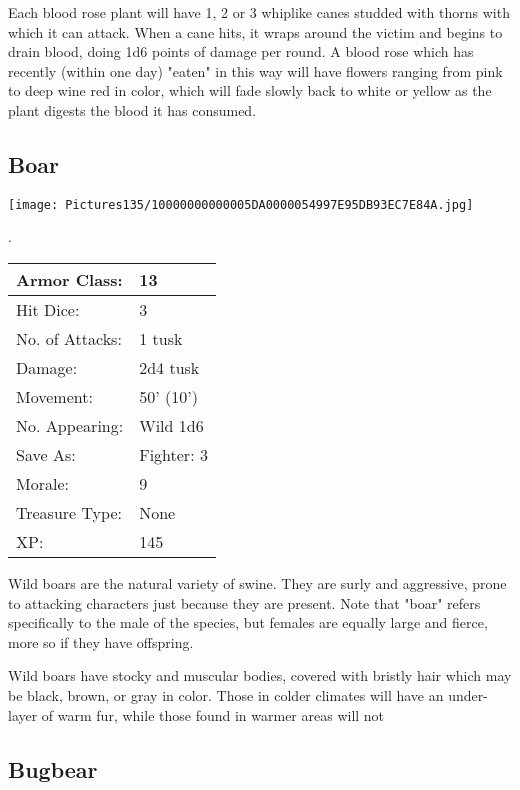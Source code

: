 \documentclass[a4paper,twoside,openany,10pt]{book}
\begin{document}
\begin{multicols}{2}
Each blood rose plant will have 1, 2 or 3 whiplike canes studded with thorns with which it can attack. When a cane hits, it wraps around the victim and begins to drain blood, doing 1d6 points of damage per round. A blood rose which has recently (within one day) "eaten" in this way will have flowers ranging from pink to deep wine red in color, which will fade slowly back to white or yellow as the plant digests the blood it has consumed.

\subsection*{Boar}\label{boar}


\begin{center}
	\texttt{[image: Pictures135/10000000000005DA0000054997E95DB93EC7E84A.jpg]}
\end{center}.

\begin{center}
	\begin{tabularx}{0.48\textwidth}{@{}lX@{}}
Armor Class: & 13 \\\hline
Hit Dice: & 3 \\\hline
No. of Attacks: & 1 tusk \\\hline
Damage: & 2d4 tusk \\\hline
Movement: & 50' (10') \\\hline
No. Appearing: & Wild 1d6 \\\hline
Save As: & Fighter: 3 \\\hline
Morale: & 9 \\\hline
Treasure Type: & None \\\hline
XP: & 145 \\\hline
\end{tabularx}\medskip

\end{center}
Wild
boars are the natural variety of swine. They are surly and aggressive, prone to attacking characters just because they are present. Note that "boar" refers specifically to the male of the species, but females are equally large and fierce, more so if they have offspring. 

Wild boars have stocky and muscular bodies, covered with bristly hair which may be black, brown, or gray in color. Those in colder climates will have an under-layer of warm fur, while those found in warmer areas will not

\subsection*{Bugbear}\label{bugbear}


\end{multicols}
\end{document}
